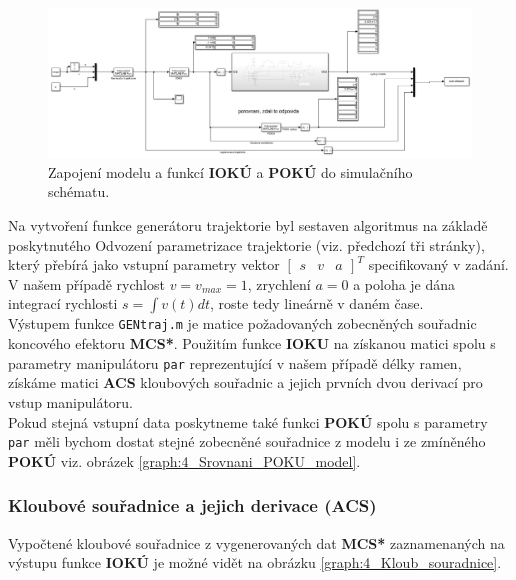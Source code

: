 \documentclass{article}
\begin{document}
				\begin{figure}[H]
					\centering
					\includegraphics[width=\textwidth]{./Graphics/4_Graphics/simulink_rozsireny_model.png}
					\caption{Zapojení modelu a funkcí \textbf{IOKÚ} a \textbf{POKÚ} do simulačního schématu.}
					\label{pic:simulink_rozsireny_model}
				\end{figure}
			
			Na vytvoření funkce generátoru trajektorie byl sestaven algoritmus na základě poskytnutého Odvození parametrizace trajektorie (viz. předchozí tři stránky), který přebírá jako vstupní parametry vektor \(\begin{bmatrix}s&v&a\end{bmatrix}^T\) specifikovaný v zadání. V našem případě rychlost \(v = v_{max}=1\), zrychlení \(a=0\) a poloha je dána integrací rychlosti \(s=\int v(t)dt\), roste tedy lineárně v daném čase.\\
			
			Výstupem funkce \verb|GENtraj.m| je matice požadovaných zobecněných souřadnic koncového efektoru \textbf{MCS*}. Použitím funkce \textbf{IOKU} na získanou matici spolu s parametry manipulátoru \verb|par| reprezentující v našem případě délky ramen, získáme matici \textbf{ACS} kloubových souřadnic a jejich prvních dvou derivací pro vstup manipulátoru.\\
			
			Pokud stejná vstupní data poskytneme také funkci \textbf{POKÚ} spolu s parametry \verb|par| měli bychom dostat stejné zobecněné souřadnice z modelu i ze zmíněného \textbf{POKÚ} viz. obrázek \ref{graph:4_Srovnani_POKU_model}. 
			\subsubsection{Kloubové souřadnice a jejich derivace (ACS)}
				Vypočtené kloubové souřadnice z vygenerovaných dat \textbf{MCS*} zaznamenaných na výstupu funkce \textbf{IOKÚ} je možné vidět na obrázku \ref{graph:4_Kloub_souradnice}. 
\end{document}
